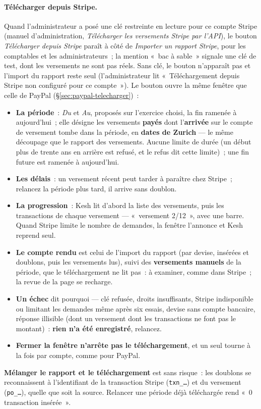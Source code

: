 \documentclass[a4paper,11pt,oneside]{article}
\begin{document}
\paragraph{Télécharger depuis Stripe.}\label{sec:stripe-telecharger} Quand l'administrateur a posé une clé restreinte en lecture pour ce compte Stripe (manuel d'administration, \emph{Télécharger les versements Stripe par l'API}), le bouton \emph{Télécharger depuis Stripe} paraît à côté de \emph{Importer un rapport Stripe}, pour les comptables et les administrateurs~; la mention «~bac à sable~» signale une clé de test, dont les versements ne sont pas réels. Sans clé, le bouton n'apparaît pas et l'import du rapport reste seul (l'administrateur lit «~Téléchargement depuis Stripe non configuré pour ce compte~»). Le bouton ouvre la même fenêtre que celle de PayPal (\S\ref{sec:paypal-telecharger})~:
\begin{itemize}
    \item \textbf{La période}~: \emph{Du} et \emph{Au}, proposés sur l'exercice choisi, la fin ramenée à aujourd'hui~; elle désigne les versements \textbf{payés} dont l'\textbf{arrivée} sur le compte de versement tombe dans la période, en \textbf{dates de Zurich} --- le même découpage que le rapport des versements. Aucune limite de durée (un début plus de trente ans en arrière est refusé, et le refus dit cette limite)~; une fin future est ramenée à aujourd'hui.
    \item \textbf{Les délais}~: un versement récent peut tarder à paraître chez Stripe~; relancez la période plus tard, il arrive sans doublon.
    \item \textbf{La progression}~: Kesh lit d'abord la liste des versements, puis les transactions de chaque versement --- «~versement 2/12~», avec une barre. Quand Stripe limite le nombre de demandes, la fenêtre l'annonce et Kesh reprend seul.
    \item \textbf{Le compte rendu} est celui de l'import du rapport (par devise, insérées et doublons, puis les versements lus), suivi des \textbf{versements manuels} de la période, que le téléchargement ne lit pas~: à examiner, comme dans Stripe~; la revue de la page se recharge.
    \item \textbf{Un échec} dit pourquoi --- clé refusée, droits insuffisants, Stripe indisponible ou limitant les demandes même après six essais, devise sans compte bancaire, réponse illisible (dont un versement dont les transactions ne font pas le montant)~: \textbf{rien n'a été enregistré}, relancez.
    \item \textbf{Fermer la fenêtre n'arrête pas le téléchargement}, et un seul tourne à la fois par compte, comme pour PayPal.
\end{itemize}
\textbf{Mélanger le rapport et le téléchargement} est sans risque~: les doublons se reconnaissent à l'identifiant de la transaction Stripe (\texttt{txn\_\dots}) et du versement (\texttt{po\_\dots}), quelle que soit la source. Relancer une période déjà téléchargée rend «~0 transaction insérée~».
\end{document}
